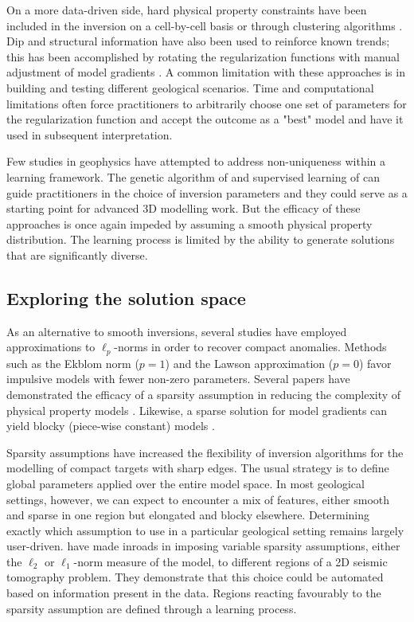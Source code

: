 On a more data-driven side, hard physical property constraints have been included in the inversion on a cell-by-cell basis \cite[]{Phillips1996, Williams08} or through clustering algorithms \cite[]{Jiajia2013, Lin2017}.
Dip and structural information have also been used to reinforce known trends; this has been accomplished by rotating the regularization functions with manual adjustment of model gradients \cite[]{LiDWO2000, Davis2012}.
A common limitation with these approaches is in building and testing different geological scenarios.
Time and computational limitations often force practitioners to arbitrarily choose one set of parameters for the regularization function and accept the outcome as a "best" model and have it used in subsequent interpretation.

Few studies in geophysics have attempted to address non-uniqueness within a learning framework. The genetic algorithm of \cite{WijnsKowalczyk07} and supervised learning of \cite{Haber2003} can guide practitioners in the choice of inversion parameters and they could serve as a starting point for advanced 3D modelling work. But the efficacy of these approaches is once again impeded by assuming a smooth physical property distribution. The learning process is limited by the ability to generate solutions that are significantly diverse.


\subsection{Exploring the solution space}
As an alternative to smooth inversions, several studies have employed approximations to $\ell_p$-norms in order to recover compact anomalies. Methods such as the Ekblom norm ($p=1$) \cite[]{Ekblom73} and the Lawson approximation \cite[]{Lawson61} ($p = 0$) favor impulsive models with fewer non-zero parameters. Several papers have demonstrated the efficacy of a sparsity assumption in reducing the complexity of physical property models \cite[]{LastKubik83, BarbosaSilva94, PortniaguineZhdanov02, Chartrand07, Ajo-Franklin07, Blaschek2008, Stocco09}. Likewise, a sparse solution for model gradients can yield blocky (piece-wise constant) models \cite[]{Li93, Gorodnitsky97, FarquharsonOldenburg98, Daubechies10, SunLi14}.

Sparsity assumptions have increased the flexibility of inversion algorithms for the modelling of compact targets with sharp edges. The usual strategy is to define global parameters applied over the entire model space. In most geological settings, however, we can expect to encounter a mix of features, either smooth and sparse in one region but elongated and blocky elsewhere. Determining exactly which assumption to use in a particular geological setting remains largely user-driven. \cite{SunLi14} have made inroads in imposing variable sparsity assumptions, either the $\ell_2$ or $\ell_1$-norm measure of the model, to different regions of a 2D seismic tomography problem. They demonstrate that this choice could be automated based on information present in the data. Regions reacting favourably to the sparsity assumption are defined through a learning process.

